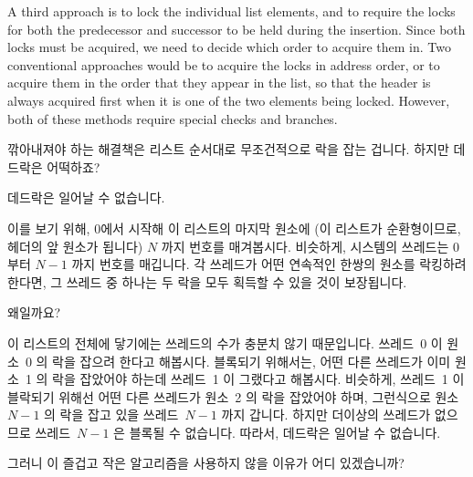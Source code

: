 A third approach is to lock the individual list elements, and to require
the locks for both the predecessor and successor to be held during the
insertion.
Since both locks must be acquired, we need to decide which order to
acquire them in.
Two conventional approaches would be to acquire the locks in address
order, or to acquire them in the order that they appear in the list,
so that the header is always acquired first when it is one of the two
elements being locked.
However, both of these methods require special checks and branches.

\fi

깎아내져야 하는 해결책은 리스트 순서대로 무조건적으로 락을 잡는 겁니다.
하지만 데드락은 어떡하죠?

데드락은 일어날 수 없습니다.

이를 보기 위해, 0에서 시작해 이 리스트의 마지막 원소에 (이 리스트가
순환형이므로, 헤더의 앞 원소가 됩니다) $N$ 까지 번호를 매겨봅시다.
비슷하게, 시스템의 쓰레드는 0 부터 $N-1$ 까지 번호를 매깁니다.
각 쓰레드가 어떤 연속적인 한쌍의 원소를 락킹하려 한다면, 그 쓰레드 중 하나는 두
락을 모두 획득할 수 있을 것이 보장됩니다.

왜일까요?

이 리스트의 전체에 닿기에는 쓰레드의 수가 충분치 않기 때문입니다.
쓰레드~0 이 원소~0 의 락을 잡으려 한다고 해봅시다.
블록되기 위해서는, 어떤 다른 쓰레드가 이미 원소~1 의 락을 잡았어야 하는데
쓰레드~1 이 그랬다고 해봅시다.
비슷하게, 쓰레드~1 이 블락되기 위해선 어떤 다른 쓰레드가 원소~2 의 락을
잡았어야 하며, 그런식으로 원소~$N-1$ 의 락을 잡고 있을 쓰레드~$N-1$ 까지
갑니다.
하지만 더이상의 쓰레드가 없으므로 쓰레드~$N-1$ 은 블록될 수 없습니다.
따라서, 데드락은 일어날 수 없습니다.

그러니 이 즐겁고 작은 알고리즘을 사용하지 않을 이유가 어디 있겠습니까?

